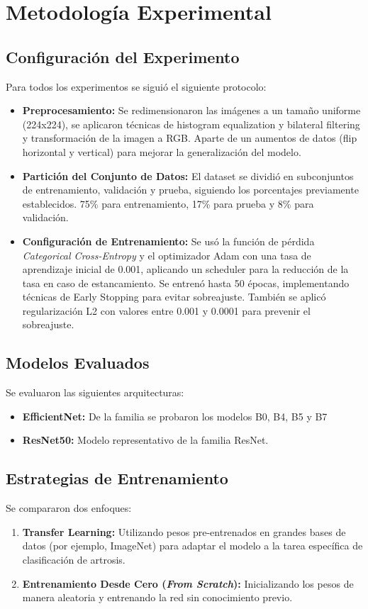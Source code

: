 \documentclass[11pt,spanish,listoffigures,listoftables]{tfgetsinf}
\begin{document}
\section{Metodología Experimental}

\subsection{Configuración del Experimento}
Para todos los experimentos se siguió el siguiente protocolo:
\begin{itemize}
    \item \textbf{Preprocesamiento:} Se redimensionaron las imágenes a un tamaño uniforme (224x224), se aplicaron técnicas de histogram equalization y bilateral filtering y transformación de la imagen a RGB. Aparte de un aumentos de datos (flip horizontal y vertical) para mejorar la generalización del modelo.
    \item \textbf{Partición del Conjunto de Datos:} El dataset se dividió en subconjuntos de entrenamiento, validación y prueba, siguiendo los porcentajes previamente establecidos. 75\% para entrenamiento, 17\% para prueba y 8\% para validación.
    \item \textbf{Configuración de Entrenamiento:} Se usó la función de pérdida \textit{Categorical Cross-Entropy} y el optimizador Adam con una tasa de aprendizaje inicial de 0.001, aplicando un scheduler para la reducción de la tasa en caso de estancamiento. Se entrenó hasta 50 épocas, implementando técnicas de Early Stopping para evitar sobreajuste. También se aplicó regularización L2 con valores entre 0.001 y 0.0001 para prevenir el sobreajuste.
\end{itemize}

\subsection{Modelos Evaluados}
Se evaluaron las siguientes arquitecturas:
\begin{itemize}
    \item \textbf{EfficientNet:} De la familia se probaron los modelos B0, B4, B5 y B7
    \item \textbf{ResNet50:} Modelo representativo de la familia ResNet.
\end{itemize}

\subsection{Estrategias de Entrenamiento}
Se compararon dos enfoques:
\begin{enumerate}
    \item \textbf{Transfer Learning:} Utilizando pesos pre-entrenados en grandes bases de datos (por ejemplo, ImageNet) para adaptar el modelo a la tarea específica de clasificación de artrosis.
    \item \textbf{Entrenamiento Desde Cero (\textit{From Scratch}):} Inicializando los pesos de manera aleatoria y entrenando la red sin conocimiento previo.
\end{enumerate}
\end{document}

